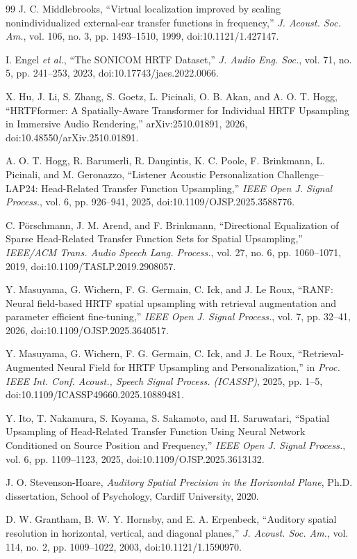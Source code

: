 \documentclass[journal]{IEEEtran}
\begin{document}
\begin{thebibliography}{99}
J. C. Middlebrooks, ``Virtual localization improved by scaling nonindividualized external-ear transfer functions in frequency,'' \textit{J. Acoust. Soc. Am.}, vol. 106, no. 3, pp. 1493--1510, 1999, doi:10.1121/1.427147.

I. Engel \textit{et al.}, ``The SONICOM HRTF Dataset,'' \textit{J. Audio Eng. Soc.}, vol. 71, no. 5, pp. 241--253, 2023, doi:10.17743/jaes.2022.0066.

X. Hu, J. Li, S. Zhang, S. Goetz, L. Picinali, O. B. Akan, and A. O. T. Hogg,
``HRTFformer: A Spatially-Aware Transformer for Individual HRTF Upsampling in Immersive Audio Rendering,''
arXiv:2510.01891, 2026, doi:10.48550/arXiv.2510.01891.

A. O. T. Hogg, R. Barumerli, R. Daugintis, K. C. Poole, F. Brinkmann, L. Picinali, and M. Geronazzo,
``Listener Acoustic Personalization Challenge--LAP24: Head-Related Transfer Function Upsampling,''
\textit{IEEE Open J. Signal Process.}, vol. 6, pp. 926--941, 2025, doi:10.1109/OJSP.2025.3588776.

C. P\"orschmann, J. M. Arend, and F. Brinkmann, ``Directional Equalization of Sparse Head-Related Transfer Function Sets for Spatial Upsampling,'' \textit{IEEE/ACM Trans. Audio Speech Lang. Process.}, vol. 27, no. 6, pp. 1060--1071, 2019, doi:10.1109/TASLP.2019.2908057.

Y. Masuyama, G. Wichern, F. G. Germain, C. Ick, and J. Le Roux,
``RANF: Neural field-based HRTF spatial upsampling with retrieval augmentation and parameter efficient fine-tuning,''
\textit{IEEE Open J. Signal Process.}, vol. 7, pp. 32--41, 2026, doi:10.1109/OJSP.2025.3640517.

Y. Masuyama, G. Wichern, F. G. Germain, C. Ick, and J. Le Roux,
``Retrieval-Augmented Neural Field for HRTF Upsampling and Personalization,''
in \textit{Proc. IEEE Int. Conf. Acoust., Speech Signal Process. (ICASSP)}, 2025, pp. 1--5, doi:10.1109/ICASSP49660.2025.10889481.

Y. Ito, T. Nakamura, S. Koyama, S. Sakamoto, and H. Saruwatari,
``Spatial Upsampling of Head-Related Transfer Function Using Neural Network Conditioned on Source Position and Frequency,''
\textit{IEEE Open J. Signal Process.}, vol. 6, pp. 1109--1123, 2025, doi:10.1109/OJSP.2025.3613132.

J. O. Stevenson-Hoare, \textit{Auditory Spatial Precision in the Horizontal Plane}, Ph.D. dissertation, School of Psychology, Cardiff University, 2020.

D. W. Grantham, B. W. Y. Hornsby, and E. A. Erpenbeck, ``Auditory spatial resolution in horizontal, vertical, and diagonal planes,'' \textit{J. Acoust. Soc. Am.}, vol. 114, no. 2, pp. 1009--1022, 2003, doi:10.1121/1.1590970.

\end{thebibliography}
\endgroup
\end{document}
